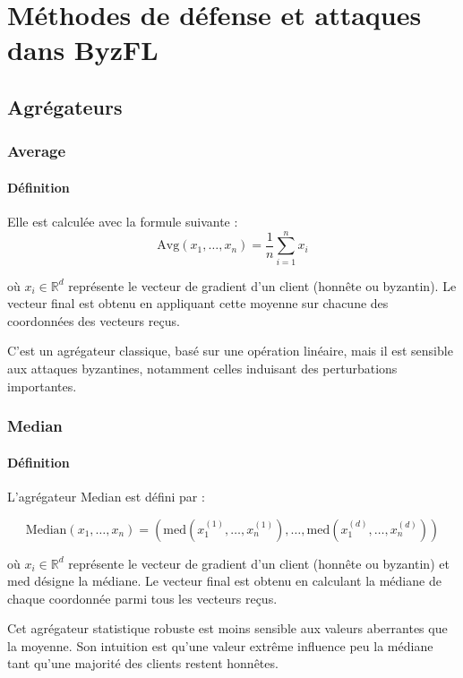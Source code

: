 \documentclass[a4paper,11pt]{article}
\begin{document}
\section{Méthodes de défense et attaques dans ByzFL}

\subsection{Agrégateurs}

\subsubsection{Average}

\paragraph{Définition}
Elle est calculée avec la formule suivante :
\[
\mathrm{Avg}(x_1, \dots, x_n) = \frac{1}{n} \sum_{i=1}^{n} x_i
\]

où $x_i \in \mathbb{R}^d$ représente le vecteur de gradient d'un client (honnête ou byzantin). Le vecteur final est obtenu en appliquant cette moyenne sur chacune des coordonnées des vecteurs reçus.

C'est un agrégateur classique, basé sur une opération linéaire, mais il est sensible aux attaques byzantines, notamment celles induisant des perturbations importantes.

\subsubsection{Median}

\paragraph{Définition}
L'agrégateur Median est défini par :

\[
\mathrm{Median}(x_1, \dots, x_n) =
\left(
\mathrm{med}(x_1^{(1)}, \dots, x_n^{(1)}),
\dots,
\mathrm{med}(x_1^{(d)}, \dots, x_n^{(d)})
\right)
\]

où $x_i \in \mathbb{R}^d$ représente le vecteur de gradient d'un client (honnête ou byzantin) et $\mathrm{med}$ désigne la médiane. Le vecteur final est obtenu en calculant la médiane de chaque coordonnée parmi tous les vecteurs reçus.

Cet agrégateur statistique robuste est moins sensible aux valeurs aberrantes que la moyenne. Son intuition est qu'une valeur extrême influence peu la médiane tant qu'une majorité des clients restent honnêtes.
\end{document}

